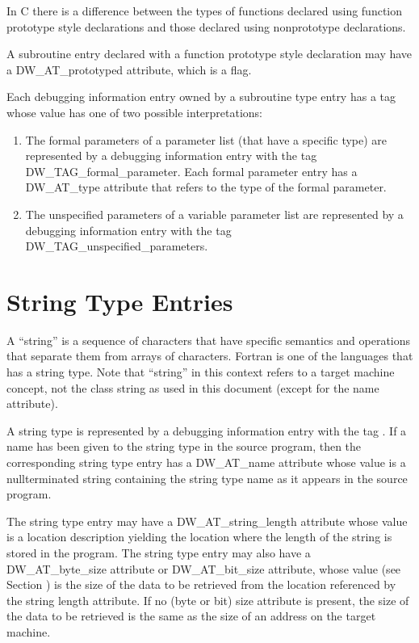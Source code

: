In C there is a difference between the types of functions
declared using function prototype style declarations and
those declared using non\dash prototype declarations.

A subroutine entry declared with a function prototype style
declaration may have a DW\_AT\_prototyped attribute, which is
a flag.

Each debugging information entry owned by a subroutine
type entry has a tag whose value has one of two possible
interpretations:

\begin{enumerate}[1.]
\item The formal parameters of a parameter list (that have a
specific type) are represented by a debugging information entry
with the tag DW\_TAG\_formal\_parameter. Each formal parameter
entry has a DW\_AT\_type attribute that refers to the type of
the formal parameter.

\item The unspecified parameters of a variable parameter list
are represented by a debugging information entry with the
tag DW\_TAG\_unspecified\_parameters.
\end{enumerate}



\section{String Type Entries}
\label{chap:stringtypeentries}


A ``string'' is a sequence of characters that have specific
semantics and operations that separate them from arrays of
characters. Fortran is one of the languages that has a string
type. Note that ``string'' in this context refers to a target
machine concept, not the class string as used in this document
(except for the name attribute).

A string type is represented by a debugging information entry
with the tag . 
If a name has been given to
the string type in the source program, then the corresponding
string type entry has a DW\_AT\_name attribute whose value is
a null\dash terminated string containing the string type name as
it appears in the source program.

The string type entry may have a DW\_AT\_string\_length attribute
whose value is a location description yielding the location
where the length of the string is stored in the program. The
string type entry may also have a DW\_AT\_byte\_size attribute
or DW\_AT\_bit\_size attribute, whose value 
(see Section ) 
is the size of the data to be retrieved from the location
referenced by the string length attribute. If no (byte or bit)
size attribute is present, the size of the data to be retrieved
is the same as the size of an address on the target machine.

